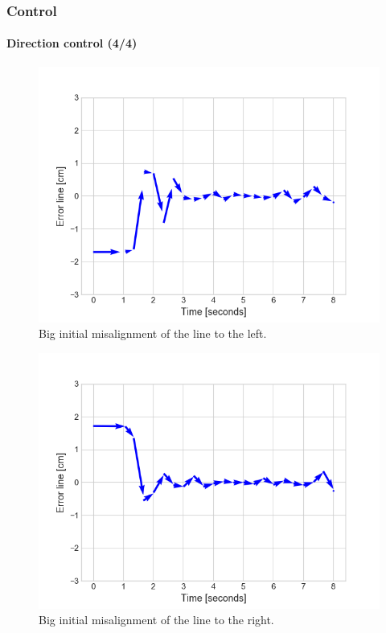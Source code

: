 \documentclass[10pt]{beamer}
\begin{document}

\begin{frame}
\frametitle{Control}
\framesubtitle{Direction control (4/4)}
\vspace*{-4mm}
\begin{multicols}{2}
\begin{figure}
\centering
\includegraphics[scale=0.4]{figures/big-perturbation-left.png}
\caption{Big initial misalignment of the line to the left.}
\label{fig:big-perturb-left}
\end{figure}
\columnbreak
\begin{figure}
\centering
\includegraphics[scale=0.4]{figures/big-perturbation-right.png}
\caption{Big initial misalignment of the line to the right.}
\label{fig:big-perturb-right}
\end{figure}
\end{multicols}
\end{frame}
\end{document}
